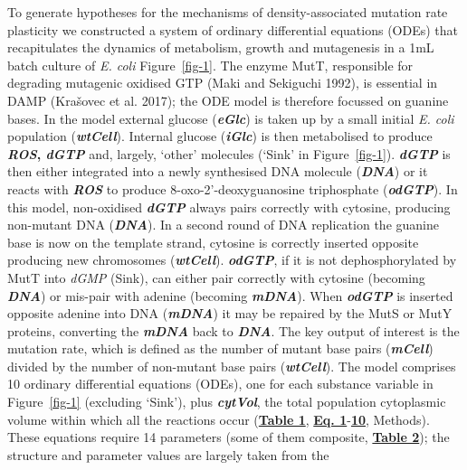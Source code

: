 \documentclass[
  12pt,
  letterpaper,
  DIV=11,
  numbers=noendperiod]{scrreprt}
\begin{document}
To generate hypotheses for the mechanisms of density-associated mutation
rate plasticity we constructed a system of ordinary differential
equations (ODEs) that recapitulates the dynamics of metabolism, growth
and mutagenesis in a 1mL batch culture of \emph{E. coli}
Figure~\ref{fig-1}. The enzyme MutT, responsible for degrading mutagenic
oxidised GTP (Maki and Sekiguchi 1992), is essential in DAMP (Krašovec
et al. 2017); the ODE model is therefore focussed on guanine bases. In
the model external glucose (\textbf{\emph{eGlc}}) is taken up by a small
initial \emph{E. coli} population (\textbf{\emph{wtCell}}). Internal
glucose (\textbf{\emph{iGlc}}) is then metabolised to produce
\textbf{\emph{ROS}, \emph{dGTP}} and, largely, `other' molecules (`Sink'
in Figure~\ref{fig-1}). \textbf{\emph{dGTP}} is then either integrated
into a newly synthesised DNA molecule (\textbf{\emph{DNA}}) or it reacts
with \textbf{\emph{ROS}} to produce 8-oxo-2'-deoxyguanosine triphosphate
(\textbf{\emph{odGTP}}). In this model, non-oxidised
\textbf{\emph{dGTP}} always pairs correctly with cytosine, producing
non-mutant DNA (\textbf{\emph{DNA}}). In a second round of DNA
replication the guanine base is now on the template strand, cytosine is
correctly inserted opposite producing new chromosomes
(\textbf{\emph{wtCell}}). \textbf{\emph{odGTP}}, if it is not
dephosphorylated by MutT into \emph{dGMP} (Sink), can either pair
correctly with cytosine (becoming \textbf{\emph{DNA}}) or mis-pair with
adenine (becoming \textbf{\emph{mDNA}}). When \textbf{\emph{odGTP}} is
inserted opposite adenine into DNA (\textbf{\emph{mDNA}}) it may be
repaired by the MutS or MutY proteins, converting the
\textbf{\emph{mDNA}} back to \textbf{\emph{DNA}}. The key output of
interest is the mutation rate, which is defined as the number of mutant
base pairs (\textbf{\emph{mCell}}) divided by the number of non-mutant
base pairs (\textbf{\emph{wtCell}}). The model comprises 10 ordinary
differential equations (ODEs), one for each substance variable in
Figure~\ref{fig-1} (excluding `Sink'), plus \textbf{\emph{cytVol}}, the
total population cytoplasmic volume within which all the reactions occur
(\href{https://www.biorxiv.org/content/10.1101/2023.09.27.557722v1.full\#T1}{\textbf{Table
1}},
\href{https://www.biorxiv.org/content/10.1101/2023.09.27.557722v1.full\#disp-formula-1}{\textbf{Eq.
1}}-\href{https://www.biorxiv.org/content/10.1101/2023.09.27.557722v1.full\#disp-formula-10}{\textbf{10}},
Methods). These equations require 14 parameters (some of them composite,
\href{https://www.biorxiv.org/content/10.1101/2023.09.27.557722v1.full\#T2}{\textbf{Table
2}}); the structure and parameter values are largely taken from the
\end{document}
